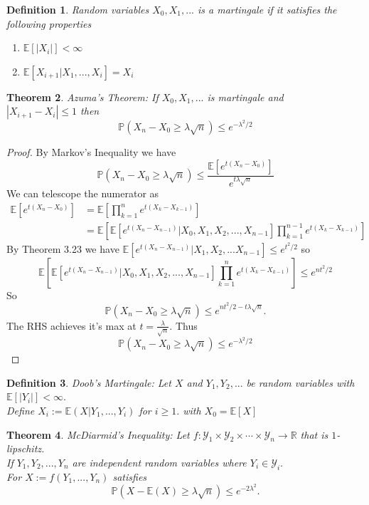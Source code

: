 \documentclass[a4paper]{article}
\newtheorem{thm}{Theorem}[section]
\newtheorem{defn}[thm]{Definition}
\begin{document}
\begin{defn}
    Random variables $X_0,X_1,...$ is a martingale if it satisfies the following properties
    \begin{enumerate}
        \item $\mathbb{E}[|X_i|]<\infty$
        \item $\mathbb{E}[X_{i+1}|X_1,...,X_i]=X_i$
    \end{enumerate}
\end{defn}
\begin{thm}
    Azuma's Theorem: If $X_0,X_1,...$ is martingale and \\$|X_{i+1}-X_i|\leq 1$ then $$\mathbb{P}(X_n-X_0\geq \lambda \sqrt{n})\leq e^{-\lambda^2/2}$$
\end{thm}
\begin{proof}
    By Markov's Inequality we have $$\mathbb{P}(X_n-X_0\geq \lambda \sqrt{n})\leq \frac{\mathbb{E}\left [e^{t(X_n-X_0)}\right ]}{e^{t\lambda\sqrt{n}}}$$
    We can telescope the numerator as 
    \begin{align*}
        \mathbb{E}\left [e^{t(X_n-X_0)}\right ]&=\mathbb{E}\left [\prod_{k=1}^{n}e^{t(X_k-X_{k-1})} \right ]\\&=\mathbb{E}\left [\mathbb{E}\left [e^{t(X_n-X_{n-1})}|X_0,X_1,X_2,...,X_{n-1} \right ]\prod_{k=1}^{n-1}e^{t(X_k-X_{k-1})} \right ]
    \end{align*}
    By Theorem 3.23 we have $\mathbb{E}\left [e^{t(X_n-X_{n-1})}|X_1,X_2,...X_{n-1}\right ]\leq e^{t^2/2}$ so $$\mathbb{E}\left [\mathbb{E}\left [e^{t(X_n-X_{n-1})}|X_0,X_1,X_2,...,X_{n-1} \right ]\prod_{k=1}^{n}e^{t(X_k-X_{k-1})} \right ]\leq e^{nt^2/2}$$
    So $$\mathbb{P}(X_n-X_0\geq \lambda \sqrt{n})\leq e^{nt^2/2-t\lambda \sqrt{n}}.$$
    The RHS achieves it's max at $t=\frac{\lambda}{\sqrt{n}}$. 
    Thus $$\mathbb{P}(X_n-X_0\geq \lambda \sqrt{n})\leq e^{-\lambda^2/2}$$
\end{proof}
\begin{defn}
    Doob's Martingale: Let $X$ and $Y_1,Y_2,...$ be random variables with $\mathbb{E}[|Y_i|]<\infty.$\\Define $X_i:=\mathbb{E}(X|Y_1,...,Y_i)$ for $i\geq 1.$ with $X_0=\mathbb{E}[X]$
\end{defn}
\begin{thm}
    McDiarmid's Inequality: Let $f:\mathcal{Y}_1\times \mathcal{Y}_2\times \cdots \times \mathcal{Y}_n\to \mathbb{R}$ that is $1$-lipschitz. \\If $Y_1,Y_2,...,Y_n$ are independent random variables where $Y_i\in \mathcal{Y}_i.$ \\For $X:=f(Y_1,...,Y_n)$ satisfies $$\mathbb{P}(X-\mathbb{E}(X)\geq \lambda \sqrt{n})\leq e^{-2\lambda^2}.$$ 
    
\end{thm}
\end{document}
